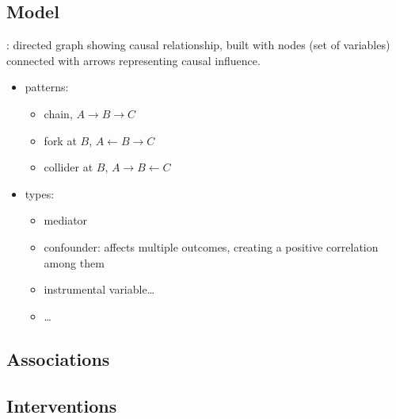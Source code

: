\documentclass[letterpaper,10pt,english]{jupyterBook}
\begin{document}
\subsection{Model}
\label{\detokenize{code/notebooks/correlation_vs_causation:model}}
\sphinxAtStartPar
{}: directed graph showing causal relationship, built with nodes (set of variables) connected with arrows representing causal influence.

\sphinxAtStartPar
{}
\begin{itemize}
\item {} 
\sphinxAtStartPar
{} patterns:
\begin{itemize}
\item {} 
\sphinxAtStartPar
chain, \(A \rightarrow B \rightarrow C\)

\item {} 
\sphinxAtStartPar
fork at \(B\), \(A \leftarrow B \rightarrow C\)

\item {} 
\sphinxAtStartPar
collider at \(B\), \(A \rightarrow B \leftarrow C\)

\end{itemize}

\item {} 
\sphinxAtStartPar
{} types:
\begin{itemize}
\item {} 
\sphinxAtStartPar
mediator

\item {} 
\sphinxAtStartPar
confounder: affects multiple outcomes, creating a positive correlation among them

\item {} 
\sphinxAtStartPar
instrumental variable…

\item {} 
\sphinxAtStartPar
…

\end{itemize}

\end{itemize}


\subsection{Associations}
\label{\detokenize{code/notebooks/correlation_vs_causation:associations}}

\subsection{Interventions}
\label{\detokenize{code/notebooks/correlation_vs_causation:interventions}}
\end{document}
